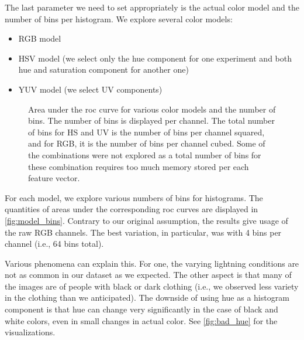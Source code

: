 The last parameter we need to set appropriately is the actual color model
and the number of bins per histogram. We explore several color models:

\begin{itemize}
    \item RGB model
    \item HSV model (we select only the hue component for one experiment and both hue and saturation component for another one)
    \item YUV model (we select UV components)
\end{itemize}

\begin{figure}
    \centering
    \def\svgwidth{\columnwidth}
    \Large
    \scalebox{0.7}{}
    \caption[Area under the ROC curve for various color models and the number of bins]{Area under the \gls{roc} curve for various color models and the number of bins. The number of bins is displayed per channel. The total number of bins for HS and UV is the number of bins per channel squared, and for RGB, it is the number of bins per channel cubed. Some of the combinations were not explored as a total number of bins for these combination requires too much memory stored per each feature vector.}
    \label{fig:model_bins}
\end{figure}

For each model, we explore various numbers of bins for histograms. The quantities of areas under the corresponding \gls{roc} curves are displayed in \autoref{fig:model_bins}. Contrary to our original
assumption, the results give usage of the raw RGB channels. The best variation, in particular, was with 4 bins per channel (i.e., 64 bins total).

Various phenomena can explain this. For one, the varying lightning
conditions are not as common in our dataset as we expected. The other aspect is that many of the images are of people with black or dark clothing (i.e., we observed less variety in the clothing than we anticipated). The downside of using hue as a histogram component is that
hue can change very significantly in the case of black and white colors, even in small
changes in actual color. See \autoref{fig:bad_hue} for the visualizations.

